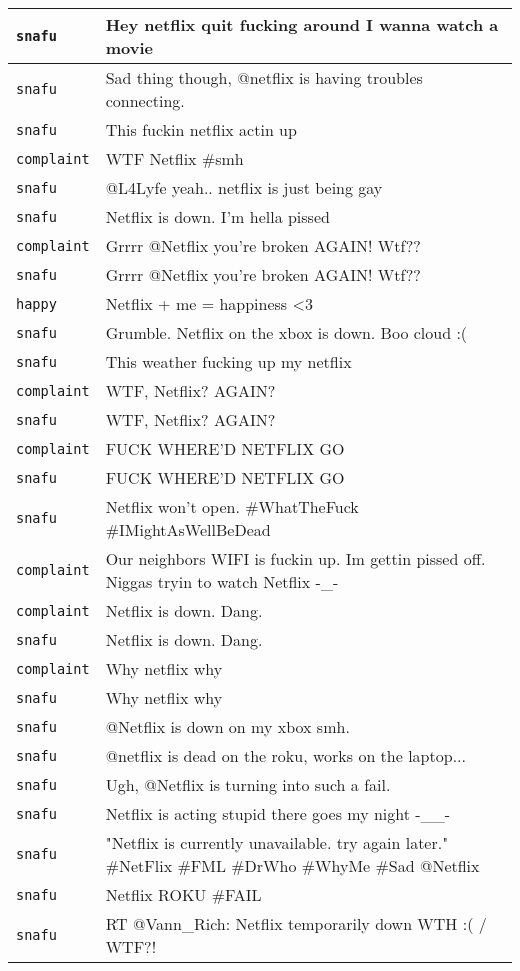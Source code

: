 \begin{center}
\begin{longtable}{|l|p{120mm}|}
      \tabularnewline\hline
         \texttt{snafu} & Hey netflix quit fucking around I wanna watch a movie
      \tabularnewline\hline
         \texttt{snafu} & Sad thing though, @netflix is having troubles connecting.
      \tabularnewline\hline
         \texttt{snafu} & This fuckin netflix actin up
      \tabularnewline\hline
         \texttt{complaint} & WTF Netflix \#smh
      \tabularnewline\hline
         \texttt{snafu} & @L4Lyfe yeah.. netflix is just being gay
      \tabularnewline\hline
         \texttt{snafu} & Netflix is down. I'm hella pissed
      \tabularnewline\hline
         \texttt{complaint} & Grrrr @Netflix you're broken AGAIN! Wtf??
      \tabularnewline\hline
         \texttt{snafu} & Grrrr @Netflix you're broken AGAIN! Wtf??
      \tabularnewline\hline
         \texttt{happy} & Netflix + me = happiness <3
      \tabularnewline\hline
         \texttt{snafu} & Grumble. Netflix on the xbox is down. Boo cloud :(
      \tabularnewline\hline
         \texttt{snafu} & This weather fucking up my netflix
      \tabularnewline\hline
         \texttt{complaint} & WTF, Netflix? AGAIN?
      \tabularnewline\hline
         \texttt{snafu} & WTF, Netflix? AGAIN?
      \tabularnewline\hline
         \texttt{complaint} & FUCK WHERE'D NETFLIX GO
      \tabularnewline\hline
         \texttt{snafu} & FUCK WHERE'D NETFLIX GO
      \tabularnewline\hline
         \texttt{snafu} & Netflix won't open. \#WhatTheFuck \#IMightAsWellBeDead
      \tabularnewline\hline
         \texttt{complaint} & Our neighbors WIFI is fuckin up. Im gettin pissed off. Niggas tryin to watch Netflix -\_-
      \tabularnewline\hline
         \texttt{complaint} & Netflix is down. Dang.
      \tabularnewline\hline
         \texttt{snafu} & Netflix is down. Dang.
      \tabularnewline\hline
         \texttt{complaint} & Why netflix why
      \tabularnewline\hline
         \texttt{snafu} & Why netflix why
      \tabularnewline\hline
         \texttt{snafu} & @Netflix is down on my xbox smh.
      \tabularnewline\hline
         \texttt{snafu} & @netflix is dead on the roku, works on the laptop...
      \tabularnewline\hline
         \texttt{snafu} & Ugh, @Netflix is turning into such a fail.
      \tabularnewline\hline
         \texttt{snafu} & Netflix is acting stupid there goes my night -\_\_-
      \tabularnewline\hline
         \texttt{snafu} & "Netflix is currently unavailable. try again later." \#NetFlix \#FML \#DrWho \#WhyMe \#Sad @Netflix
      \tabularnewline\hline
         \texttt{snafu} & Netflix ROKU \#FAIL
      \tabularnewline\hline
         \texttt{snafu} & RT @Vann\_Rich: Netflix temporarily down WTH :( / WTF?!

\end{longtable}
\end{center}
